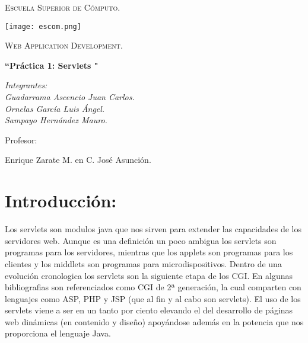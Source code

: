 \documentclass[titlepage, 12pt]{article}
\begin{document}
\begin{titlepage}
	\centering
	{\scshape\LARGE Escuela Superior de Cómputo. \par}
	\vspace{1cm}
	
	\texttt{[image: escom.png]}\par\vspace{1cm}
	
	{\scshape\Large Web Application Development.\par}
	\vspace{1cm}
	
	{\Large\bfseries ``Práctica 1: Servlets "\par}
	\vspace{1cm}
	
    {\Large\itshape Integrantes:  \\ Guadarrama Ascencio Juan Carlos. \\ Ornelas García Luis Ángel. \\ Sampayo Hernández Mauro. \par}
	\vspace{1cm}
	
	\vfill
	Profesor:\par
	Enrique Zarate M. en C. José Asunción.
	\vfill
\end{titlepage}

\tableofcontents
\newpage

\listoffigures
\newpage


\section{Introducción:}

Los servlets son modulos java que nos sirven para extender las capacidades de los servidores web. Aunque es una definición un poco ambigua los servlets son programas para los servidores, mientras que los applets son programas para los clientes y los middlets son programas para microdispositivos. Dentro de una evolución cronologica los servlets son la siguiente etapa de los CGI. En algunas bibliografias son referenciados como CGI de 2ª generación, la cual comparten con lenguajes como ASP, PHP y JSP (que al fin y al cabo son servlets). El uso de los servlets viene a ser en un tanto por ciento elevando el del desarrollo de páginas web dinámicas (en contenido y diseño) apoyándose además en la potencia que nos proporciona el lenguaje Java. \par\vspace{0.5cm}
\end{document}
